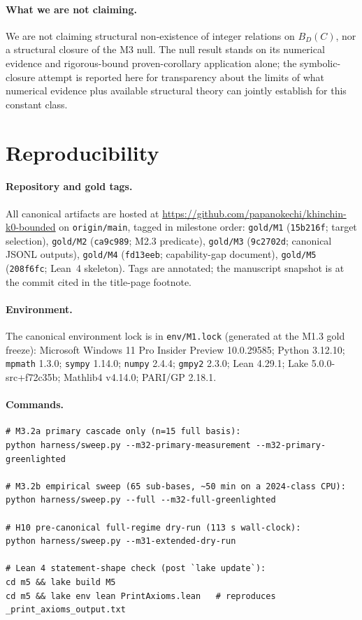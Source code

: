\documentclass[11pt,a4paper]{article}
\newcommand{\BDC}{B_{D}(C)}
\begin{document}
\paragraph{What we are not claiming.}
We are not claiming structural non-existence of integer relations on
$\BDC$, nor a structural closure of the M3 null.
The null result stands on its numerical evidence and rigorous-bound
proven-corollary application alone; the symbolic-closure attempt is
reported here for transparency about the limits of what numerical evidence
plus available structural theory can jointly establish for this constant
class.

\appendix

\section{Reproducibility}\label{app:reproducibility}

\paragraph{Repository and gold tags.}
All canonical artifacts are hosted at
\url{https://github.com/papanokechi/khinchin-k0-bounded}
on \texttt{origin/main}, tagged in milestone order:
\texttt{gold/M1} (\texttt{15b216f}; target selection),
\texttt{gold/M2} (\texttt{ca9c989}; M2.3 predicate),
\texttt{gold/M3} (\texttt{9c2702d}; canonical JSONL outputs),
\texttt{gold/M4} (\texttt{fd13eeb}; capability-gap document),
\texttt{gold/M5} (\texttt{208f6fc}; Lean~4 skeleton).
Tags are annotated; the manuscript snapshot is at the commit cited in the
title-page footnote.

\paragraph{Environment.}
The canonical environment lock is in
\texttt{env/M1.lock}
(generated at the M1.3 gold freeze):
Microsoft Windows 11 Pro Insider Preview 10.0.29585; Python 3.12.10;
\texttt{mpmath} 1.3.0; \texttt{sympy} 1.14.0; \texttt{numpy} 2.4.4;
\texttt{gmpy2} 2.3.0; Lean 4.29.1; Lake 5.0.0-src+f72c35b; Mathlib4
v4.14.0; PARI/GP 2.18.1.

\paragraph{Commands.}
\begin{lstlisting}
# M3.2a primary cascade only (n=15 full basis):
python harness/sweep.py --m32-primary-measurement --m32-primary-greenlighted

# M3.2b empirical sweep (65 sub-bases, ~50 min on a 2024-class CPU):
python harness/sweep.py --full --m32-full-greenlighted

# H10 pre-canonical full-regime dry-run (113 s wall-clock):
python harness/sweep.py --m31-extended-dry-run

# Lean 4 statement-shape check (post `lake update`):
cd m5 && lake build M5
cd m5 && lake env lean PrintAxioms.lean   # reproduces _print_axioms_output.txt
\end{lstlisting}
\end{document}
